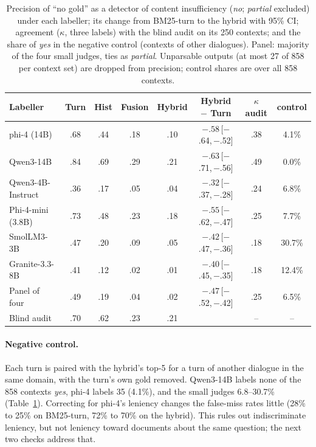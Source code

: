 \documentclass[11pt]{article}
\newcommand{\ci}[2]{\,{\scriptsize[#1,\,#2]}}
\newcommand{\cno}{\textit{no}}
\newcommand{\cyes}{\textit{yes}}
\newcommand{\cpart}{\textit{partial}}
\begin{document}
\begin{table}[t]
\centering
\caption{Precision of ``no gold'' as a detector of content insufficiency (\cno; \cpart{} excluded) under each labeller; its change from BM25-turn to the hybrid with 95\% CI; agreement ($\kappa$, three labels) with the blind audit on its 250 contexts; and the share of \cyes{} in the negative control (contexts of other dialogues). Panel: majority of the four small judges, ties as \cpart. Unparsable outputs (at most 27 of 858 per context set) are dropped from precision; control shares are over all 858 contexts.}
\label{tab:judges}
\setlength{\tabcolsep}{3.5pt}
\begin{tabular}{@{}lccccccc@{}}
\toprule
Labeller & Turn & Hist & Fusion & Hybrid & Hybrid $-$ Turn & $\kappa$ audit & control \\
\midrule
phi-4 (14B) & .68 & .44 & .18 & .10 & $-.58$\ci{$-$.64}{$-$.52} & .38 & 4.1\% \\
Qwen3-14B & .84 & .69 & .29 & .21 & $-.63$\ci{$-$.71}{$-$.56} & .49 & 0.0\% \\
\addlinespace[2pt]
Qwen3-4B-Instruct & .36 & .17 & .05 & .04 & $-.32$\ci{$-$.37}{$-$.28} & .24 & 6.8\% \\
Phi-4-mini (3.8B) & .73 & .48 & .23 & .18 & $-.55$\ci{$-$.62}{$-$.47} & .25 & 7.7\% \\
SmolLM3-3B & .47 & .20 & .09 & .05 & $-.42$\ci{$-$.47}{$-$.36} & .18 & 30.7\% \\
Granite-3.3-8B & .41 & .12 & .02 & .01 & $-.40$\ci{$-$.45}{$-$.35} & .18 & 12.4\% \\
Panel of four & .49 & .19 & .04 & .02 & $-.47$\ci{$-$.52}{$-$.42} & .25 & 6.5\% \\
\addlinespace[2pt]
Blind audit & .70 & .62 & .23 & .21 & & -- & -- \\
\bottomrule
\end{tabular}
\end{table}

\paragraph{Negative control.}
Each turn is paired with the hybrid's top-5 for a turn of another dialogue in the same domain, with the turn's own gold removed. Qwen3-14B labels none of the 858 contexts \cyes, phi-4 labels 35 (4.1\%), and the small judges 6.8--30.7\% (Table~\ref{tab:judges}). Correcting for phi-4's leniency changes the false-miss rates little (28\% to 25\% on BM25-turn, 72\% to 70\% on the hybrid). This rules out indiscriminate leniency, but not leniency toward documents about the same question; the next two checks address that.
\end{document}
